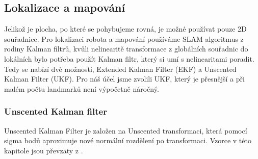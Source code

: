 \documentclass[a4paper,12pt]{article}
\begin{document}
\subsection{Lokalizace a mapování}
Jelikož je plocha, po které se pohybujeme rovná, je možné používat pouze 2D souřadnice. Pro lokalizaci robota a mapování používáme SLAM algoritmus z rodiny 
Kalman filtrů, kvůli nelinearitě transformace z globálních souřadnic do lokálních bylo potřeba použít Kalman filtr, který si umí s nelinearitami poradit. 
Tedy se nabízí dvě možnosti, Extended Kalman Filter (EKF) a Unscented Kalman Filter (UKF). Pro náš účel jsme zvolili UKF, který je přesnější a při malém počtu landmarků není výpočetně náročný.
\subsubsection{Unscented Kalman filter}
\label{sec:ukf}
Unscented Kalman Filter je založen na Unscented transformaci, která pomocí sigma bodů aproximuje nové normální rozdělení po transformaci. Vzorce v této kapitole jsou převzaty z \cite{UKF}. \\
\end{document}
